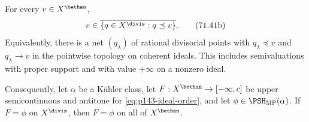 \begin{theorem}\label{thm:p143-dominated-divisorial-density}
For every \(v\in X^{\bethan}\),
\[
 v\in\overline{\{q\in X^{\divis}:q\preceq v\}}.
\tag{71.41b}\label{eq:p143-dominated-divisorial-density}
\]
Equivalently, there is a net \((q_\lambda)\) of rational divisorial
points with \(q_\lambda\preceq v\) and \(q_\lambda\to v\) in the
pointwise topology on coherent ideals.  This includes semivaluations with
proper support and with value \(+\infty\) on a nonzero ideal.

Consequently, let \(\alpha\) be a K\"ahler class, let
\(F:X^{\bethan}\to[-\infty,c]\) be upper semicontinuous and antitone for
\eqref{eq:p143-ideal-order}, and let \(\phi\in\PSH_{\mathrm{MP}}(\alpha)\).
If \(F=\phi\) on \(X^{\divis}\), then \(F=\phi\) on all of
\(X^{\bethan}\).
\end{theorem}

